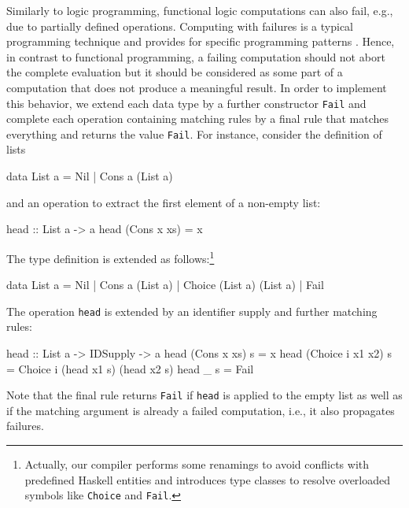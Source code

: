 \documentclass{llncs}
\newcommand{\code}[1]{\mbox{\small\texttt{#1}}}
\begin{document}
Similarly to logic programming,
functional logic computations can also fail, e.g.,
due to partially defined operations.
Computing with failures is a typical programming technique
and provides for specific programming patterns \cite{AntoyHanus02FLOPS}.
Hence, in contrast to functional programming,
a failing computation should not abort the complete evaluation
but it should be considered as some part of a computation that
does not produce a meaningful result.
In order to implement this behavior, we extend
each data type by a further constructor \code{Fail}
and complete each operation containing matching rules
by a final rule that matches everything and returns the value \code{Fail}.
For instance, consider the definition of lists
\begin{curry}
  data List a = Nil | Cons a (List a)
\end{curry}
and an operation to extract the first element of a non-empty list:
\begin{curry}
  head :: List a -> a
  head (Cons x xs) = x
\end{curry}
The type definition is extended as follows:\footnote{Actually,
our compiler performs some renamings to avoid conflicts with
predefined Haskell entities and introduces type classes
to resolve overloaded symbols like \code{Choice} and \code{Fail}.}
\begin{haskell}
  data List a = Nil | Cons a (List a) | Choice (List a) (List a) | Fail
\end{haskell}
The operation \code{head} is extended by an identifier supply
and further matching rules:
\begin{haskell}
  head :: List a -> IDSupply -> a
  head (Cons x xs)      s = x
  head (Choice i x1 x2) s = Choice i (head x1 s) (head x2 s)
  head _                s = Fail
\end{haskell}
Note that the final rule returns \code{Fail} if \code{head} is
applied to the empty list as well as if the matching argument
is already a failed computation, i.e., it also propagates failures.
\end{document}
